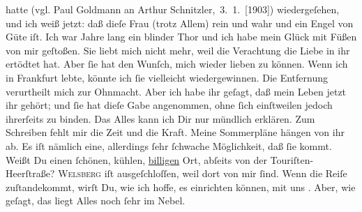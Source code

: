 \begin{ledgroupsized}[t]{13cm}
{{{                  hatte (vgl. Paul Goldmann an Arthur Schnitzler, 3. 1. [1903])}}}\label{K_L03377-1h}
               wiedergeſehen, und ich weiß jetzt: daß dieſe Frau (trotz Allem) rein und wahr und ein Engel von Güte iſt.
               Ich war Jahre lang ein blinder Thor und ich habe mein Glück mit Füßen von mir
               geſtoßen. Sie liebt mich nicht mehr, weil die Verachtung die Liebe in ihr ertödtet
               hat. Aber ſie hat den Wunſch, mich wieder lieben zu können. Wenn ich in Frankfurt lebte, könnte ich ſie vielleicht
               wiedergewinnen. Die Entfernung verurtheilt mich zur Ohnmacht. Aber ich habe  ihr geſagt, daß mein Leben jetzt ihr gehört; und ſie
               hat dieſe Gabe angenommen, ohne ſich einſtweilen jedoch ihrerſeits zu {\pb}binden. Das Alles kann ich Dir nur mündlich
               erklären. Zum Schreiben fehlt mir die Zeit und die Kraft.\pend
           \pstart
           Meine Sommerpläne hängen von ihr ab. Es iſt nämlich eine, allerdings ſehr ſchwache Möglichkeit, daß ſie
                  \label{K_L03377-2v}\label{K_L03377-2h} kommt. Weißt Du einen ſchönen, kühlen, \uline{billigen} Ort, abſeits von der Touriſten-Heerſtraße? \textsc{Welsberg} iſt ausgeſchloſſen, weil dort \label{K_L03377-3v}\label{K_L03377-3h} von mir ſind. Wenn die Reiſe zuſtandekommt, wirſt
               Du, wie ich hoffe, es einrichten können, mit uns \label{K_L03377-4v}\label{K_L03377-4h}. Aber, wie geſagt, das liegt Alles noch ſehr im Nebel.\pend

\end{ledgroupsized}
